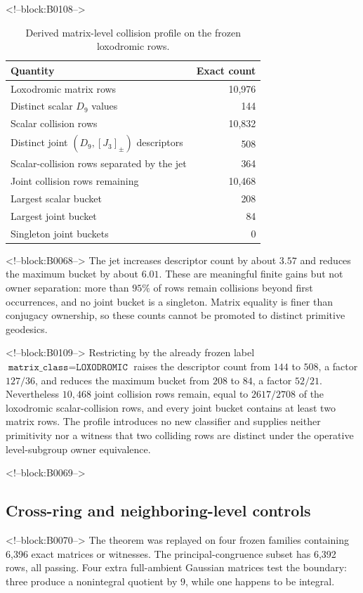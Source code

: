 \documentclass[11pt,a4paper]{article}
\theoremstyle{definition}
\theoremstyle{remark}
\begin{document}
<!--block:B0108-->
\begin{table}[t]
\centering
\caption{Derived matrix-level collision profile on the frozen loxodromic rows.}
\label{tab:collision-loxodromic}
\begin{tabular}{lr}
\toprule
Quantity & Exact count \\
\midrule
Loxodromic matrix rows & 10,976 \\
Distinct scalar \(D_9\) values & 144 \\
Scalar collision rows & 10,832 \\
Distinct joint \((D_9,[J_3]_{\pm})\) descriptors & 508 \\
Scalar-collision rows separated by the jet & 364 \\
Joint collision rows remaining & 10,468 \\
Largest scalar bucket & 208 \\
Largest joint bucket & 84 \\
Singleton joint buckets & 0 \\
\bottomrule
\end{tabular}
\end{table}

<!--block:B0068-->
The jet increases descriptor count by about \(3.57\) and reduces the maximum bucket by about \(6.01\). These are meaningful finite gains but not owner separation: more than \(95\%\) of rows remain collisions beyond first occurrences, and no joint bucket is a singleton. Matrix equality is finer than conjugacy ownership, so these counts cannot be promoted to distinct primitive geodesics.

<!--block:B0109-->
Restricting by the already frozen label \(\texttt{matrix\_class}=\texttt{LOXODROMIC}\) raises the descriptor count from \(144\) to \(508\), a factor \(127/36\), and reduces the maximum bucket from \(208\) to \(84\), a factor \(52/21\). Nevertheless \(10{,}468\) joint collision rows remain, equal to \(2617/2708\) of the loxodromic scalar-collision rows, and every joint bucket contains at least two matrix rows. The profile introduces no new classifier and supplies neither primitivity nor a witness that two colliding rows are distinct under the operative level-subgroup owner equivalence.

<!--block:B0069-->
\subsection{Cross-ring and neighboring-level controls}

<!--block:B0070-->
The theorem was replayed on four frozen families containing 6,396 exact matrices or witnesses. The principal-congruence subset has 6,392 rows, all passing. Four extra full-ambient Gaussian matrices test the boundary: three produce a nonintegral quotient by \(9\), while one happens to be integral.
\end{document}
